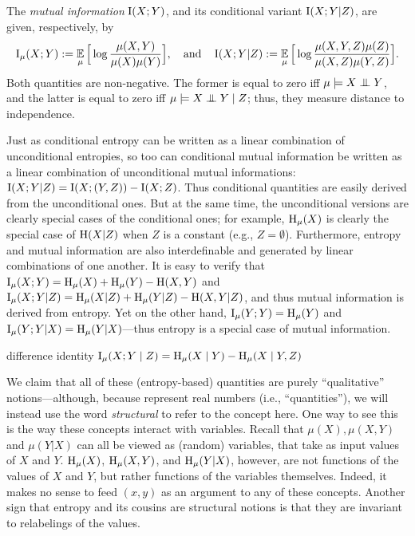 The \emph{mutual information} $\operatorname{\mathrm{I}}(X;Y)$,
and its conditional variant $\operatorname{\mathrm{I}}(X;Y|Z)$, 
are given, respectively, by
\[
    \operatorname{\mathrm{I}}_\mu(X;Y) :=
        \operatorname*{\mathbb{E}}_{\mu} \Big[ \log \frac{\mu(X,Y)}{\mu(X) \mu(Y)}\Big],
    \quad\text{and}\quad
    \operatorname{\mathrm{I}}(X;Y|Z):= 
        \operatorname*{\mathbb{E}}_{\mu} \Big[ \log \frac{\mu(X,Y,Z)\mu(Z)}{\mu(X,Z) \mu(Y,Z)}\Big].
\]
Both quantities are non-negative.
The former is equal to zero iff $\mu \models X \mathrel{\perp\mspace{-10mu}\perp} Y$, and the latter is equal to zero iff $\mu \models X \mathrel{\perp\mspace{-10mu}\perp} Y \mid Z$;
thus, they measure distance to independence. 


Just as conditional entropy can be written as a linear combination of unconditional entropies, so too can conditional mutual information be written as a linear combination of unconditional mutual informations: $\operatorname{\mathrm{I}}(X;Y|Z) = \operatorname{\mathrm{I}}(X;(Y,Z)) - \operatorname{\mathrm{I}}(X;Z)$.  
Thus conditional quantities are easily derived from the unconditional ones. But at the same time, the unconditional versions are clearly special cases of the conditional ones; for example, $\operatorname{\mathrm{H}}_\mu(X)$ is clearly the special case of $\operatorname{\mathrm{H}}(X|Z)$ when $Z$ is a constant (e.g., $Z = \emptyset$). 
Furthermore, entropy and mutual information are also interdefinable and generated by linear combinations of one another. 
It is easy to verify that 
$\operatorname{\mathrm{I}}_\mu(X;Y) 
    = \operatorname{\mathrm{H}}_\mu(X) + \operatorname{\mathrm{H}}_\mu(Y) - \operatorname{\mathrm{H}}(X,Y)
$
and 
$\operatorname{\mathrm{I}}_\mu(X;Y|Z)
    = \operatorname{\mathrm{H}}_\mu(X|Z) + \operatorname{\mathrm{H}}_\mu(Y|Z) - \operatorname{\mathrm{H}}(X,Y|Z)
$,
and thus mutual information is derived from entropy. 
Yet on the other hand, $\operatorname{\mathrm{I}}_\mu(Y;Y) = \operatorname{\mathrm{H}}_\mu(Y)$ and $\operatorname{\mathrm{I}}_\mu(Y;Y|X) = \operatorname{\mathrm{H}}_\mu(Y|X)$---thus entropy is a special case of mutual information. 



difference identity
$\operatorname{\mathrm{I}}_\mu(X ; Y \mid Z) =
      \operatorname{\mathrm{H}}_\mu(X \mid Y) - \operatorname{\mathrm{H}}_\mu(X \mid Y, Z)$



We claim that all of these (entropy-based) quantities are purely ``qualitative'' notions---although, because represent real numbers (i.e., ``quantities''), we will instead use the word \emph{structural} to refer to the concept here.
One way to see this is the way these concepts interact with variables. 
Recall that $\mu(X), \mu(X,Y)$ and $\mu(Y|X)$ can all be viewed as (random) variables, that take as input values of $X$ and $Y$. 
$\operatorname{\mathrm{H}}_\mu(X)$, $\operatorname{\mathrm{H}}_\mu(X,Y)$, and $\operatorname{\mathrm{H}}_\mu(Y|X)$, however, 
    are not functions of the values of $X$ and $Y$, but rather functions 
    of the variables themselves. 
Indeed, it makes no sense to feed $(x,y)$ as an argument to any of these concepts. 
Another sign that entropy and its cousins are structural notions is that they are invariant to relabelings of the values.

